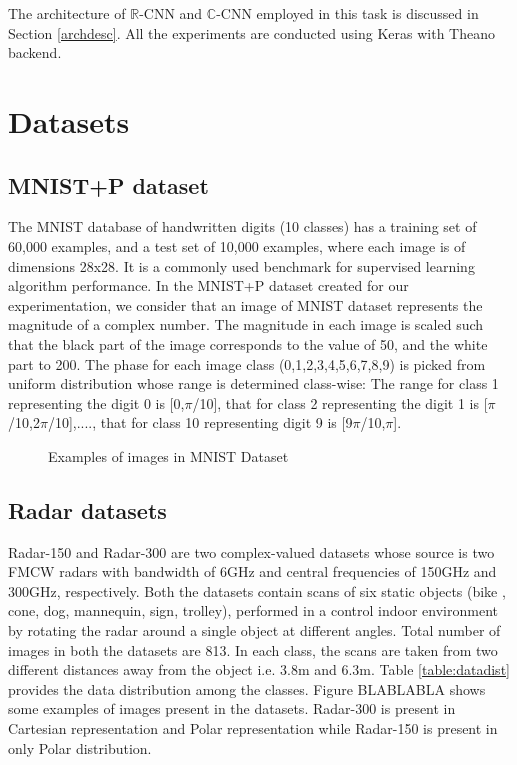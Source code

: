  The architecture of $\mathbb{R}$-CNN and $\mathbb{C}$-CNN employed in this task is discussed in Section \ref{archdesc}.  All the experiments are conducted using Keras \cite{chollet2015keras} with Theano \cite{theano} backend.
 
 
 \section{Datasets}\label{datasets}
 
 
 \subsection{MNIST+P dataset}\label{data-mnistp}
 The MNIST database of handwritten digits (10 classes) has a training set of 60,000 examples, and a test set of 10,000 examples, where each image is of dimensions 28x28. It is a commonly used benchmark for supervised learning algorithm performance. In the MNIST+P dataset created for our experimentation, we consider that an image of MNIST dataset represents the magnitude of a complex number. The magnitude in each image is scaled such that the black part of the image corresponds to the value of 50, and the white part to 200. The phase for each image class (0,1,2,3,4,5,6,7,8,9) is picked from uniform distribution whose range is determined class-wise: The range for class 1 representing the digit 0 is [0,$\pi$/10], that for class 2 representing the digit 1 is [$\pi$/10,2$\pi$/10],...., that for class 10 representing digit 9 is [9$\pi$/10,$\pi$]. 
 
 \begin{figure}[htb]
 	\centering
 	\epsfxsize=7cm
 	{}\caption{Examples of images in MNIST Dataset \cite{mnistimage}}
 	\label{fig:blocks}
 \end{figure}
 
 \subsection{Radar datasets}\label{data-radar}
 
 Radar-150 and Radar-300 are two complex-valued datasets whose source is two FMCW radars with bandwidth of 6GHz and central frequencies of 150GHz and 300GHz, respectively.
 Both the datasets contain scans of six static objects (bike , cone, dog, mannequin, sign, trolley), performed in a control indoor environment by rotating the radar around a single object at different angles. Total number of images in both the datasets are 813. In each class, the scans are taken from two different distances away from the object i.e. 3.8m and 6.3m. Table \ref{table:datadist} provides the data distribution among the classes. Figure BLABLABLA shows some examples of images present in the datasets. Radar-300 is present in Cartesian representation and Polar representation while Radar-150 is present in only Polar distribution. 
 
